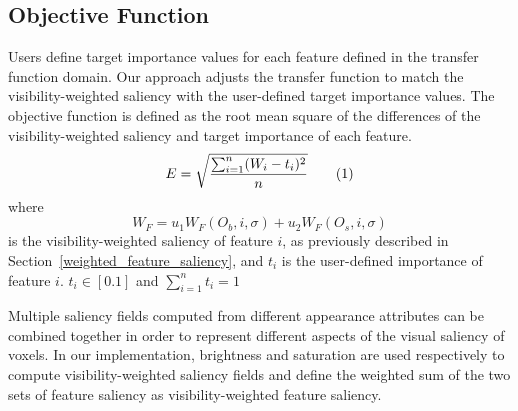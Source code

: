 \subsection{Objective Function}
Users define target importance values for each feature defined in the transfer function domain.
Our approach adjusts the transfer function to match the visibility-weighted saliency with the user-defined target importance values.
The objective function is defined as the root mean square of the differences of the visibility-weighted saliency and target importance of each feature.
\[ E=\sqrt{ \frac{\sum_{i=1}^{n} (W_{i}-t_{i})^{2}}{n} } 
\addtag \]
where \[ W_{F}=u_{1}W_{F}(O_{b},i,\sigma)+u_{2}W_{F}(O_{s},i,\sigma) \] is the visibility-weighted saliency of feature $ i $, as previously described in Section~\ref{weighted_feature_saliency}, and $ t_{i} $ is the user-defined importance of feature $ i $.
$ t_{i} \in [0.1] $ and $ \sum_{i=1}^{n} t_{i} = 1 $

Multiple saliency fields computed from different appearance attributes can be combined together in order to represent different aspects of the visual saliency of voxels.
In our implementation, brightness and saturation are used respectively to compute visibility-weighted saliency fields and define the weighted sum of the two sets of feature saliency as visibility-weighted feature saliency.


